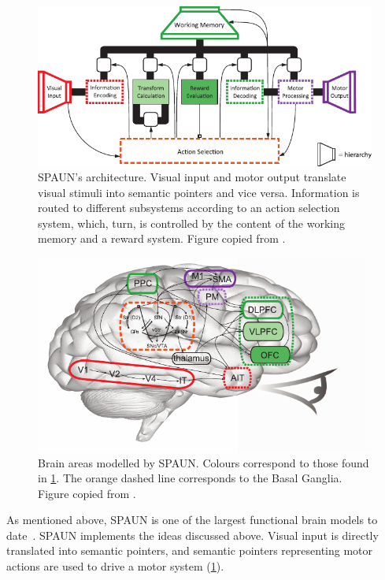 \documentclass[10pt,letterpaper,oneside]{article}
\begin{document}
\begin{figure}
	\includegraphics[width=\textwidth]{media/eliasmith_2012_spaun_architecture.pdf}
	\caption{SPAUN's architecture. Visual input and motor output translate visual stimuli into semantic pointers and vice versa. Information is routed to different subsystems according to an action selection system, which, turn, is controlled by the content of the working memory and a reward system. Figure copied from \cite{eliasmith2012largescale}.}
	\label{fig:eliasmith_2012_spaun_architecture}
\end{figure}

\begin{figure}
	\includegraphics[width=\textwidth]{media/eliasmith_2012_spaun_anatomy.pdf}
	\caption{Brain areas modelled by SPAUN. Colours correspond to those found in \cref{fig:eliasmith_2012_spaun_architecture}. The orange dashed line corresponds to the Basal Ganglia. Figure copied from \cite{eliasmith2012largescale}.}
	\label{fig:eliasmith_2012_spaun_anatomy}
\end{figure}

As mentioned above, SPAUN is one of the largest functional brain models to date~\cite{eliasmith2012largescale}. SPAUN implements the ideas discussed above. Visual input is directly translated into semantic pointers, and semantic pointers representing motor actions are used to drive a motor system (\cref{fig:eliasmith_2012_spaun_architecture}).
\end{document}
